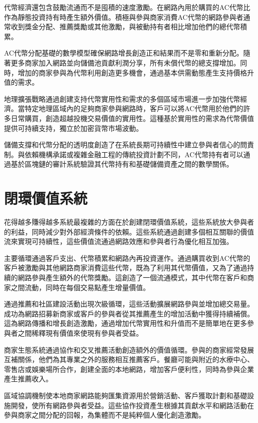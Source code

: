 \documentclass[
  Letterpaper,
]{scrbook}
\begin{document}
代幣經濟還包含鼓勵流通而不是囤積的速度激勵。在網路內用於購買的AC代幣比作為靜態投資持有時產生額外價值。積極與參與商家消費AC代幣的網路參與者通常收到獎金分配、推薦獎勵或其他激勵，與被動持有者相比增加他們的總代幣積累。

AC代幣分配基礎的數學模型確保網路增長創造正和結果而不是零和重新分配。隨著更多商家加入網路並向儲備池貢獻利潤分享，所有未償代幣的總支撐增加。同時，增加的商家參與為代幣利用創造更多機會，通過基本供需動態產生支持價格升值的需求。

地理擴張戰略通過創建支持代幣實用性和需求的多個區域市場進一步加強代幣經濟。當特定地理區域內的足夠商家參與網路時，客戶可以將AC代幣用於他們的許多日常購買，創造超越投機交易價值的實用性。這種基於實用性的需求為代幣價值提供可持續支持，獨立於加密貨幣市場波動。

儲備支撐和代幣分配的透明度創造了在系統長期可持續性中建立參與者信心的問責制。與依賴機構承諾或複雜金融工程的傳統投資計劃不同，AC代幣持有者可以通過基於區塊鏈的審計系統驗證其代幣持有和基礎儲備資產之間的數學關係。

\section{閉環價值系統}\label{ux9589ux74b0ux50f9ux503cux7cfbux7d71}

花得越多賺得越多系統最複雜的方面在於創建閉環價值系統，這些系統放大參與者的利益，同時減少對外部經濟條件的依賴。這些系統通過創建多個相互關聯的價值流來實現可持續性，這些價值流通過網路效應和參與者行為優化相互加強。

主要循環通過客戶支出、代幣積累和網路內再投資運作。通過購買收到AC代幣的客戶被激勵與其他網路商家消費這些代幣，既為了利用其代幣價值，又為了通過持續的網路參與產生額外的代幣獎勵。這創造了一個流通模式，其中代幣在客戶和商家之間流動，同時在每個交易點產生增量價值。

通過推薦和社區建設活動出現次級循環，這些活動擴展網路參與並增加總交易量。成功為網路招募新商家或客戶的參與者從其推薦產生的增加活動中獲得持續補償。這為網路傳播和增長創造激勵，通過增加代幣實用性和升值而不是簡單地在更多參與者之間稀釋現有價值來使現有參與者受益。

商家生態系統通過協作和交叉推薦活動創造額外的價值循環。參與的商家經常發展互補關係，他們為其專業之外的服務相互推薦客戶。餐廳可能與附近的水療中心、零售店或娛樂場所合作，創建全面的本地網路，增加客戶便利性，同時為參與企業產生推薦收入。

區域協調機制使本地商家網路能夠匯集資源用於營銷活動、客戶獲取計劃和基礎設施開發，使所有網路參與者受益。這些協作投資產生根據其貢獻水平和網路活動在參與商家之間分配的回報，為集體而不是純粹個人優化創造激勵。
\end{document}
